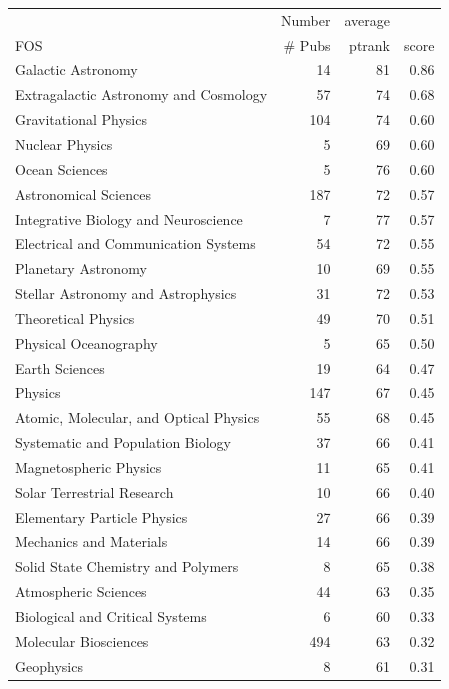 \documentclass{sig-alternate}
\begin{document}
\begin{table}[h]
\begin{tiny}
\begin{tabular}{p{}rrr}
         &  Number &  average &     \\
FOS   &  \# Pubs &  ptrank   &     score \\
\hline
Galactic Astronomy &  14 & 81 &  0.86 \\
Extragalactic Astronomy and Cosmology &  57 &  74 &  0.68 \\
Gravitational Physics &  104 &    74 &  0.60 \\
Nuclear Physics & 5 &   69 &  0.60 \\
Ocean Sciences  & 5 &   76 &  0.60 \\
Astronomical Sciences &  187 &    72 &  0.57 \\
Integrative Biology and Neuroscience &   7 &   77 &  0.57 \\
Electrical and Communication Systems &   54 &  72 &  0.55 \\
Planetary Astronomy &    10 &  69 &  0.55 \\
Stellar Astronomy and Astrophysics &  31 &  72 &  0.53 \\
Theoretical Physics &    49 &  70 &  0.51 \\
Physical Oceanography &  5 &   65 &  0.50 \\
Earth Sciences  & 19 &  64 &  0.47 \\
Physics & 147 &    67 &  0.45 \\
Atomic, Molecular, and Optical Physics  & 55 &  68 &  0.45 \\
Systematic and Population Biology &   37 &  66 &  0.41 \\
Magnetospheric Physics  & 11 &  65 &  0.41 \\
Solar Terrestrial Research &  10 &  66 &  0.40 \\
Elementary Particle Physics &    27 &  66 &  0.39 \\
Mechanics and Materials & 14 &  66 &  0.39 \\
Solid State Chemistry and Polymers &  8 &   65 &  0.38 \\
Atmospheric Sciences &   44 &  63 &  0.35 \\
Biological and Critical Systems & 6 &   60 &  0.33 \\
Molecular Biosciences &  494 &    63 &  0.32 \\
Geophysics &  8 &   61 &  0.31 \\

\end{tabular}
\end{tiny}
\end{table}
\end{document}

